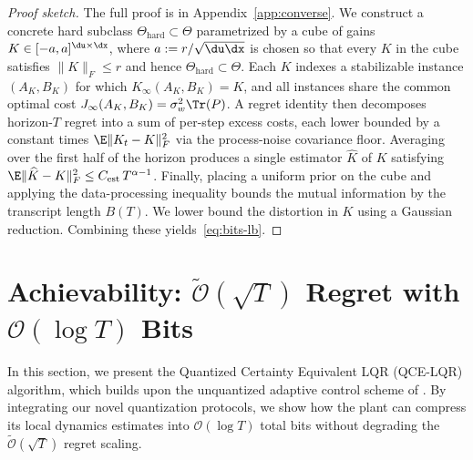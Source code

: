 \documentclass[11pt,journal,onecolumn]{IEEEtran}
\begin{document}
\begin{proof}[Proof sketch]
    The full proof is in Appendix~\ref{app:converse}. We construct a concrete hard subclass $\Theta_{\mathrm{hard}} \subset \Theta$ parametrized by a cube of gains $K \in [-a,a]^{\du \times \dx}$, where $a := r/\sqrt{\du\dx}$ is chosen so that every $K$ in the cube satisfies $\|K\|_F \le r$ and hence $\Theta_{\mathrm{hard}} \subset \Theta$. Each $K$ indexes a stabilizable instance $(A_K, B_K)$ for which $K_\infty(A_K,B_K) = K$, and all instances share the common optimal cost $J_\infty(A_K,B_K) = \sigma_w^2 \Tr(P)$. A regret identity then decomposes horizon-$T$ regret into a sum of per-step excess costs, each lower bounded by a constant times $\E\|K_t - K\|_F^2$ via the process-noise covariance floor. Averaging over the first half of the horizon produces a single estimator $\widehat K$ of $K$ satisfying $\E\|\widehat K - K\|_F^2 \le C_{\mathrm{est}}\,T^{\alpha-1}$. Finally, placing a uniform prior on the cube and applying the data-processing inequality bounds the mutual information by the transcript length $B(T)$. We lower bound the distortion in $K$ using a Gaussian reduction. Combining these yields~\eqref{eq:bits-lb}.
\end{proof}


\section{Achievability: \texorpdfstring{$\tilde{\mathcal{O}}(\sqrt T)$}{O\textasciitilde(sqrt T)} Regret with \texorpdfstring{$\mathcal{O}(\log T)$}{(log T)} Bits}
\label{sec:achievability}

In this section, we present the Quantized Certainty Equivalent LQR (QCE-LQR) algorithm, which builds upon the unquantized adaptive control scheme of \cite{simchowitz20a}. By integrating our novel quantization protocols, we show how the plant can compress its local dynamics estimates into $\mathcal{O}(\log T)$ total bits without degrading the $\tilde{\mathcal{O}}(\sqrt{T})$ regret scaling.
\end{document}
